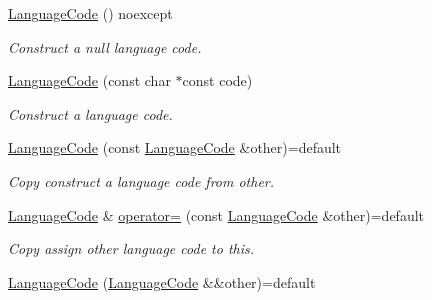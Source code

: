 \begin{DoxyCompactItemize}
\item 
\hyperlink{class_mdt_1_1_translation_1_1_language_code_a12446cda133a32e94dff98813c1a2135}{Language\+Code} () noexcept\hypertarget{class_mdt_1_1_translation_1_1_language_code_a12446cda133a32e94dff98813c1a2135}{}\label{class_mdt_1_1_translation_1_1_language_code_a12446cda133a32e94dff98813c1a2135}

\begin{DoxyCompactList}\small\item\em Construct a null language code. \end{DoxyCompactList}\item 
\hyperlink{class_mdt_1_1_translation_1_1_language_code_a1015dc2b18e9fd832c8a81f49afbea9e}{Language\+Code} (const char $\ast$const code)
\begin{DoxyCompactList}\small\item\em Construct a language code. \end{DoxyCompactList}\item 
\hyperlink{class_mdt_1_1_translation_1_1_language_code_af373dfcced0f6822a2bbc9e960222574}{Language\+Code} (const \hyperlink{class_mdt_1_1_translation_1_1_language_code}{Language\+Code} \&other)=default\hypertarget{class_mdt_1_1_translation_1_1_language_code_af373dfcced0f6822a2bbc9e960222574}{}\label{class_mdt_1_1_translation_1_1_language_code_af373dfcced0f6822a2bbc9e960222574}

\begin{DoxyCompactList}\small\item\em Copy construct a language code from {\itshape other}. \end{DoxyCompactList}\item 
\hyperlink{class_mdt_1_1_translation_1_1_language_code}{Language\+Code} \& \hyperlink{class_mdt_1_1_translation_1_1_language_code_a1790bc98d87a72ebcdb94a35339cfe63}{operator=} (const \hyperlink{class_mdt_1_1_translation_1_1_language_code}{Language\+Code} \&other)=default\hypertarget{class_mdt_1_1_translation_1_1_language_code_a1790bc98d87a72ebcdb94a35339cfe63}{}\label{class_mdt_1_1_translation_1_1_language_code_a1790bc98d87a72ebcdb94a35339cfe63}

\begin{DoxyCompactList}\small\item\em Copy assign {\itshape other} language code to this. \end{DoxyCompactList}\item 
\hyperlink{class_mdt_1_1_translation_1_1_language_code_a9f56b0e6f85d2ff0e485be6da33e1252}{Language\+Code} (\hyperlink{class_mdt_1_1_translation_1_1_language_code}{Language\+Code} \&\&other)=default\hypertarget{class_mdt_1_1_translation_1_1_language_code_a9f56b0e6f85d2ff0e485be6da33e1252}{}\label{class_mdt_1_1_translation_1_1_language_code_a9f56b0e6f85d2ff0e485be6da33e1252}


\end{DoxyCompactItemize}
